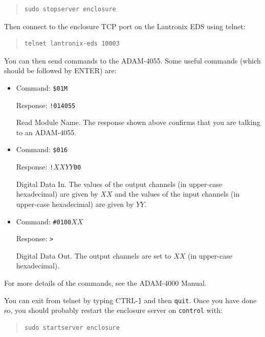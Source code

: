 \begin{quotation}
\begin{verbatim}
sudo stopserver enclosure
\end{verbatim}
\end{quotation}

Then connect to the enclosure TCP port on the Lantronix EDS using telnet:

\begin{quotation}
\begin{verbatim}
telnet lantronix-eds 10003
\end{verbatim}
\end{quotation}

You can then send commands to the ADAM-4055. Some useful commands (which should be followed by ENTER) are:

\begin{itemize}
\item Command: \verb|$01M|

Response: \verb|!014055|

Read Module Name. The response shown above confirms that you are talking to an ADAM-4055.

\item 
Command: \verb|$016|

Response: \verb|!|$XXYY$\verb|00|

Digital Data In. The values of the output channels (in upper-case hexadecimal) are given by $XX$ and the values of the input channels (in upper-case hexadecimal) are given by $YY$.

\item 
Command: \verb|#0100|$XX$

Response: \verb|>|

Digital Data Out. The output channels are set to $XX$ (in upper-case hexadecimal).

\end{itemize}

For more details of the commands, see the ADAM-4000 Manual.

You can exit from telnet by typing CTRL-\verb|]| and then \verb|quit|. Once you have done so, you should probably restart the enclosure server on \verb|control| with:

\begin{quotation}
\begin{verbatim}
sudo startserver enclosure
\end{verbatim}
\end{quotation}

